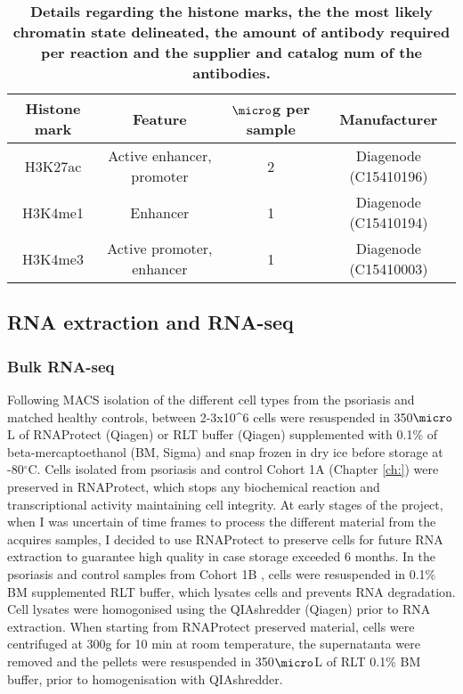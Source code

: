 \begin{table}[htbp]
\setlength{\tabcolsep}{20pt}
\renewcommand{\arraystretch}{1.5}
\begin{tabular}{@{} c c c c}
\toprule
\textbf{Histone mark} & \textbf{Feature} &\textbf{$\micro$g per sample} & \textbf{Manufacturer}\\
\midrule
H3K27ac & Active enhancer, promoter & 2 & Diagenode (C15410196)\\
H3K4me1 & Enhancer & 1 & Diagenode (C15410194)\\
H3K4me3 & Active promoter, enhancer & 1 & Diagenode (C15410003) \\
\bottomrule
\end{tabular}
\medskip %
\caption[Antibody panel used for immunoprecipitation of histone marks in ChIPm]{\textbf{Details regarding the histone marks, the the most likely chromatin state delineated, the amount of antibody required per reaction and the supplier and catalog num of the antibodies.}}
\label{tab:ChIPm_antibodies}
\end{table}
\bigskip %


\subsection{RNA extraction and RNA-seq}

\subsubsection{Bulk RNA-seq}
Following MACS isolation of the different cell types from the psoriasis and matched healthy controls, between 2-3x10^6 cells were resuspended in 350$\micro$L of RNAProtect (Qiagen) or RLT buffer (Qiagen) supplemented with 0.1\% of beta-mercaptoethanol (BM, Sigma) and snap frozen in dry ice before storage at -80{$^\circ$}C. Cells isolated from psoriasis and control Cohort 1A (Chapter \ref{ch:}) were preserved in RNAProtect, which stops any biochemical reaction and transcriptional activity maintaining cell integrity. At early stages of the project, when I was uncertain of time frames to process the different material from the acquires samples, I decided to use RNAProtect to preserve cells for future RNA extraction to guarantee high quality in case storage exceeded 6 months. In the psoriasis and control samples from Cohort 1B %
, cells were resuspended in 0.1\% BM supplemented RLT buffer, which lysates cells and prevents RNA degradation. Cell lysates were homogonised using the QIAshredder (Qiagen) prior to RNA extraction. When starting from RNAProtect preserved material, cells were centrifuged at 300g for 10 min at room temperature, the supernatanta were removed and the pellets were resuspended in 350$\micro$L of RLT 0.1\% BM buffer, prior to homogenisation with QIAshredder.

